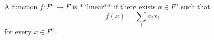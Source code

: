 \begin{definition}
\label{def:linear-functions-over-finite-fields}
\leanok
A function $f : F^n \to F$ is **linear** if there exists
  $a \in F^n$ such that
  \[
    f(x) = \sum_i a_i x_i
  \]
  for every $x \in F^n$.
\end{definition}
